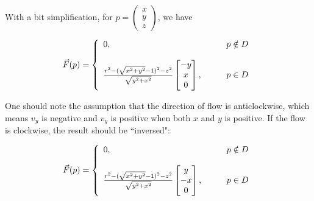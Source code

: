 \begin{exercise}{8}
\begin{enumerate}
    With a bit simplification, for $p = \begin{pmatrix}x\\y\\z\end{pmatrix}$, we have
    
    $$\vec{F}(p) =
      \left\{
      \begin{array}{lcr}
        0, & \quad & p \notin D \\ & & \\
        \frac{r^2 - (\sqrt{x^2 + y^2} - 1)^2 - z^2}{\sqrt{y^2 + x^2}}
        \begin{bmatrix}-y\\x\\0\end{bmatrix},
           & \quad & p \in D
      \end{array}
      \right.$$
      
    One should note the assumption that the direction of flow is anticlockwise, which means
    $v_y$ is negative and $v_y$ is positive when both $x$ and $y$ is positive. If the flow
    is clockwise, the result should be ``inversed":
    
    $$\vec{F}(p) =
      \left\{
      \begin{array}{lcr}
        0, & \quad & p \notin D \\ & & \\
        \frac{r^2 - (\sqrt{x^2 + y^2} - 1)^2 - z^2}{\sqrt{y^2 + x^2}}
        \begin{bmatrix}y\\-x\\0\end{bmatrix},
           & \quad & p \in D
      \end{array}
      \right.$$
    
  \end{enumerate}
\end{exercise}